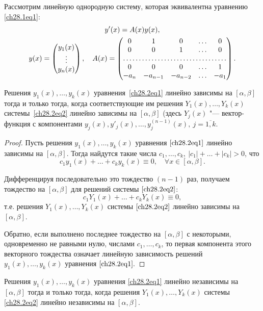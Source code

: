 Рассмотрим линейную однородную систему, которая эквивалентна уравнению \eqref{ch28.1eq1}:
\begin{multline} \label{ch28.2eq2}
y'(x) = A(x)y(x), \\
y(x) = \begin{pmatrix}
y_1(x) \\
\vdots \\
y_n(x)
\end{pmatrix},\quad
A(x) = \begin{pmatrix}
0 & 1 & 0 & \ldots & 0 \\
0 & 0 & 1 & \ldots & 0 \\
\hdotsfor{5} \\
0 & 0 & 0 & \ldots & 1 \\
-a_n & -a_{n - 1} & -a_{n - 2} & \ldots & -a_1
\end{pmatrix}.
\end{multline}

\begin{lemm} \label{ch28.2lemm1}
Решения $y_1(x), \ldots, y_k(x)$ уравнения~\eqref{ch28.2eq1} линейно зависимы на $[\alpha, \beta]$ тогда и только тогда, когда соответствующие им решения $Y_1(x), \ldots, Y_k(x)$ системы~\eqref{ch28.2eq2} линейно зависимы на $[\alpha,\beta]$ (здесь $Y_j(x)$ "--- вектор-функция с компонентами $y_j(x), y'_j(x), \ldots, y^{(n - 1)}_j(x), \ j = \overline{1,k}$.
\end{lemm}

\begin{proof}
Пусть решения $y_1(x), \ldots, y_k(x)$ уравнения $\eqref{ch28.2eq1}$ линейно зависимы на $[\alpha, \beta]$. Тогда найдутся такие числа $c_1, \ldots, c_k, \: |c_1| + \ldots + |c_k| > 0$, что 
$$
c_1y_1(x) + \ldots + c_ky_k(x) \equiv 0, \quad \forall x \in [\alpha, \beta].
$$

Дифференцируя последовательно это тождество $(n - 1)$ раз, получаем тождество на $[\alpha, \beta]$ для решений системы $\eqref{ch28.2eq2}$:
$$
c_1Y_1(x) + \ldots + c_kY_k(x) \equiv 0,
$$
т.е. решения $Y_1(x), \ldots, Y_k(x)$ системы $\eqref{ch28.2eq2}$ линейно зависимы на $[\alpha, \beta]$.

Обратно, если выполнено последнее тождество на $[\alpha, \beta]$ с некоторыми, одновременно не равными нулю, числами $c_1, \ldots, c_k$, то первая компонента этого векторного тождества означает линейную зависимость решений $y_1(x), \ldots, y_k(x)$ уравнения $\eqref{ch28.2eq1}.$
\end{proof}

\begin{cons}
Решения $y_1(x), \ldots, y_k(x)$ уравнения \eqref{ch28.2eq1} линейно независимы на $[\alpha, \beta]$ тогда и только тогда, когда решения $Y_1(x), \ldots, Y_k(x)$ системы \eqref{ch28.2eq2} линейно независимы на $[\alpha, \beta]$.
\end{cons}


